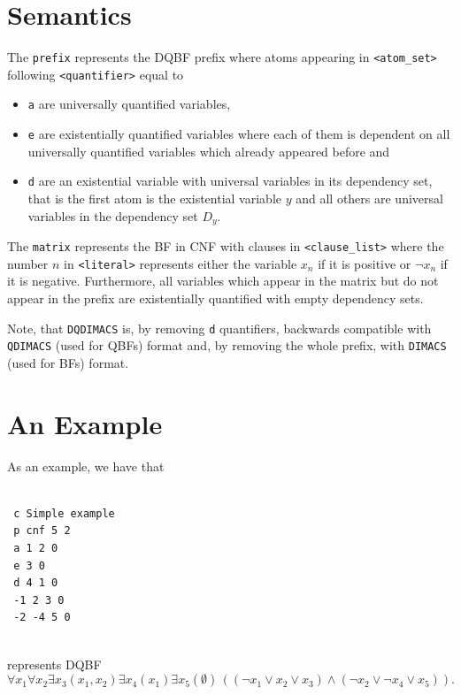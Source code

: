 \documentclass[
  digital, %
  color,
  twoside, %
  table,   %
  nolof,     %
  nolot,     %
]{fithesis3}
\theoremstyle{definition}
\theoremstyle{remark}
\newcommand{\itholds}{\,}
\newcommand{\DQDIMACS}[0]{\texttt{DQDIMACS}}
\begin{document}
\section{Semantics}
The \verb|prefix| represents the DQBF prefix where atoms appearing in \verb|<atom_set>| following \verb|<quantifier>| equal to
\begin{itemize}
    \item \verb|a| are universally quantified variables,
    \item \verb|e| are existentially quantified variables where each of them is dependent on all universally quantified variables which already appeared before and 
    \item \verb|d| are an existential variable with universal variables in its dependency set, that is the first atom is the existential variable $y$ and all others are universal variables in the dependency set $D_y$.
\end{itemize}

\begin{sloppypar}
The \verb|matrix| represents the BF in CNF with clauses in \verb|<clause_list>| where the number $n$ in \verb|<literal>| represents either the variable $x_n$ if it is positive or $\neg x_n$ if it is negative. Furthermore, all variables which appear in the matrix but do not appear in the prefix are existentially quantified with empty dependency sets. 
\end{sloppypar}

Note, that \DQDIMACS{} is, by removing \verb|d| quantifiers, backwards compatible with \texttt{QDIMACS} (used for QBFs) format and, by removing the whole prefix, with \texttt{DIMACS} (used for BFs) format.

\section{An Example}
As an example, we have that
\begin{verbatim}

 c Simple example
 p cnf 5 2
 a 1 2 0
 e 3 0
 d 4 1 0
 -1 2 3 0
 -2 -4 5 0
 
\end{verbatim}
represents DQBF
\[\forall x_1 \forall  x_2 \exists x_3 (x_1, x_2) \exists x_4(x_1) \exists x_5(\emptyset) \itholds ((\neg x_1 \lor x_2 \lor x_3) \land (\neg x_2 \lor \neg x_4 \lor x_5)).\]
\end{document}
